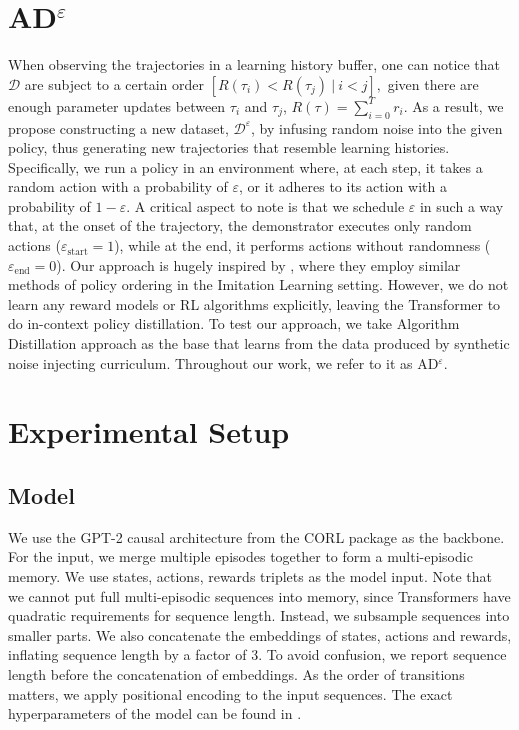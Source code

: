 \documentclass{article}
\theoremstyle{plain}
\theoremstyle{definition}
\theoremstyle{remark}
\begin{document}
\section{AD$^\varepsilon$}
\label{sec:ad_eps}
When observing the trajectories in a learning history buffer, one can notice that  $\mathcal{D}$ are subject to a certain order $\left[R(\tau_i) < R(\tau_j) \ | \ i < j \right],$ given there are enough parameter updates between $\tau_i$ and $\tau_j$, $R(\tau) = \sum_{i=0}^{T}{r_i}$. As a result, we propose constructing a new dataset, $\mathcal{D}^{\varepsilon}$, by infusing random noise into the given policy, thus generating new trajectories that resemble learning histories. Specifically, we run a policy in an environment where, at each step, it takes a random action with a probability of $\varepsilon$, or it adheres to its action with a probability of $1 - \varepsilon$. A critical aspect to note is that we schedule $\varepsilon$ in such a way that, at the onset of the trajectory, the demonstrator executes only random actions ($\varepsilon_\textrm{start} = 1$), while at the end, it performs actions without randomness ($\varepsilon_\textrm{end} = 0$). Our approach is hugely inspired by \citet{brown2020better}, where they employ similar methods of policy ordering in the Imitation Learning setting. However, we do not learn any reward models or RL algorithms explicitly, leaving the Transformer to do in-context policy distillation.
To test our approach, we take Algorithm Distillation \cite{laskin2022context} approach as the base that learns from the data produced by synthetic noise injecting curriculum. Throughout our work, we refer to it as AD${^\varepsilon}$.
\section{Experimental Setup}
\subsection{Model}
We use the GPT-2 causal architecture \cite{radford2019language} from the CORL package \cite{tarasov2022corl} as the backbone. For the input, we merge multiple episodes together to form a multi-episodic memory. We use states, actions, rewards triplets as the model input. Note that we cannot put full multi-episodic sequences into memory, since Transformers have quadratic requirements for sequence length. Instead, we subsample sequences into smaller parts. We also concatenate the embeddings of states, actions and rewards, inflating sequence length by a factor of 3. To avoid confusion, we report sequence length before the concatenation of embeddings. As the order of transitions matters, we apply positional encoding to the input sequences. The exact hyperparameters of the model can be found in .
\end{document}
